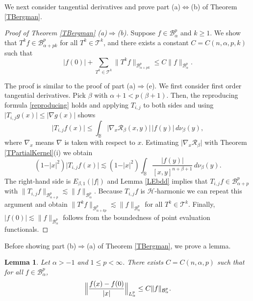 \documentclass{amsart}
\newtheorem{lemma}[theorem]{Lemma}
\theoremstyle{definition}
\theoremstyle{remark}
\begin{document}
We next consider tangential derivatives and prove part (a)$\Leftrightarrow$(b)
of Theorem \ref{TBergman}.

\begin{proof}[Proof of Theorem \ref{TBergman} (a)$\Rightarrow$(b)]
Suppose $f\in\mathcal B^p_\alpha$ and $k\ge 1$.
We show that $T^k f\in\mathcal B^p_{\alpha+pk}$ for all $T^k\in\mathcal T^k$,
and there exists a constant $C=C(n,\alpha,p,k)$ such that
\begin{equation*}
\vert f(0)\vert+
\sum_{T^k\in\mathcal T^k}\|T^k f\|_{\mathcal B^p_{\alpha+pk}}
\le C \|f\|_{\mathcal B^p_\alpha}.
\end{equation*}

The proof is similar to the proof of part (a)$\Rightarrow$(e).
We first consider first order tangential derivatives.
Pick $\beta$ with $\alpha+1<p(\beta+1)$.
Then, the reproducing formula \eqref{reproducing} holds and applying
$T_{i,j}$ to both sides and using
$\vert T_{i,j} g(x)\vert \le \vert\nabla g(x)\vert$ shows
\begin{equation*}
\vert T_{i,j} f(x)\vert \le\int_{\mathbb B}
\vert \nabla_x \mathcal R_\beta(x,y)\vert\, \vert f(y)\vert\,d\nu_\beta(y),
\end{equation*}
where $\nabla_x$ means $\nabla$ is taken with respect to $x$.
Estimating $\vert\nabla_x \mathcal R_\beta\vert$ with
Theorem \ref{TPartialKernel}(i) we obtain
\begin{equation*}
(1-\vert x\vert^2)\vert T_{i,j} f(x)\vert
\lesssim (1-\vert x\vert^2)\int_{\mathbb B}
\frac{\vert f(y)\vert}{[x,y]^{n+\beta+1}}\,d\nu_\beta(y).
\end{equation*}
The right-hand side is $E_{\beta,1}(\vert f\vert)$ and Lemma \ref{LEbdd}
implies that $T_{i,j}f\in\mathcal B^p_{\alpha+p}$ with
$\|T_{i,j}f\|_{\mathcal B^p_{\alpha+p}}\lesssim \|f\|_{\mathcal B^p_\alpha}$.
Because $T_{i,j}f$ is $\mathcal H$-harmonic we can repeat this argument
and obtain
$\|T^k f\|_{\mathcal B^p_{\alpha+kp}}\lesssim \|f\|_{\mathcal B^p_\alpha}$
for all $T^k\in\mathcal T^k$.
Finally, $\vert f(0)\vert\lesssim \|f\|_{\mathcal B^p_\alpha}$ follows from
the boundedness of point evaluation functionals.
\end{proof}

Before showing part (b)$\Rightarrow$(a) of Theorem \ref{TBergman},
we prove a lemma.

\begin{lemma}\label{Ldividex}
Let $\alpha>-1$ and $1\le p<\infty$.
There exists $C=C(n,\alpha,p)$ such that for all $f\in\mathcal B^p_\alpha$,
\begin{equation*}
\Bigl\|\frac{f(x)-f(0)}{\vert x\vert}\Bigr\|_{L^p_\alpha}
\le C\|f\|_{\mathcal B^p_\alpha}.
\end{equation*}
\end{lemma}
\end{document}
